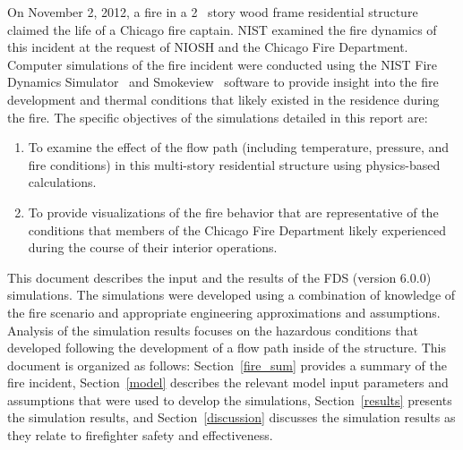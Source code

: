 \documentclass[12pt,oneside]{book}
\begin{document}
On November 2, 2012, a fire in a 2~ story wood frame residential structure claimed the life of a Chicago fire captain. NIST examined the fire dynamics of this incident at the request of NIOSH and the Chicago Fire Department. Computer simulations of the fire incident were conducted using the NIST Fire Dynamics Simulator~\cite{FDS_Users_Guide} and Smokeview~\cite{Smokeview_Users_Guide}  software to provide insight into the fire development and thermal conditions that likely existed in the residence during the fire. The specific objectives of the simulations detailed in this report are: 
\begin{enumerate}
\item To examine the effect of the flow path (including temperature, pressure, and fire conditions) in this multi-story residential structure using physics-based calculations.
\item To provide visualizations of the fire behavior that are representative of the conditions that members of the Chicago Fire Department likely experienced during the course of their interior operations.
\end{enumerate}
This document describes the input and the results of the FDS (version 6.0.0) simulations. The simulations were developed using a combination of knowledge of the fire scenario and appropriate engineering approximations and assumptions. Analysis of the simulation results focuses on the hazardous conditions that developed following the development of a flow path inside of the structure. This document is organized as follows: Section~\ref{fire_sum} provides a summary of the fire incident, Section~\ref{model} describes the relevant model input parameters and assumptions that were used to develop the simulations, Section~\ref{results} presents the simulation results, and Section~\ref{discussion} discusses the simulation results as they relate to firefighter safety and effectiveness. 
\end{document}
